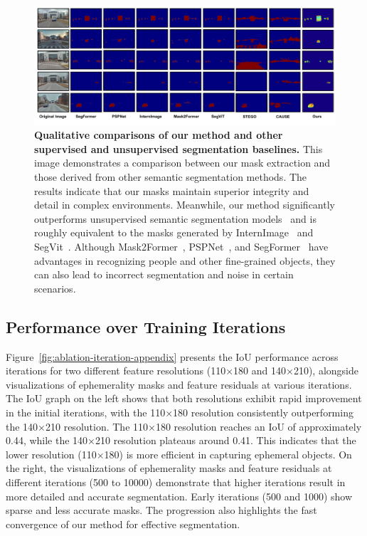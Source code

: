 \label{subsec:vis-compareison-appendix}
\begin{figure}[ht]
\begin{center}
\centerline{\includegraphics[width=\columnwidth]{figs_compressed/seg-compare_compressed.pdf}}
\caption{\textbf{Qualitative comparisons of our method and other supervised and unsupervised segmentation baselines.} This image demonstrates a comparison between our mask extraction and those derived from other semantic segmentation methods. The results indicate that our masks maintain superior integrity and detail in complex environments. Meanwhile, our method significantly outperforms unsupervised semantic segmentation models~\cite{hamilton2022unsupervised,kim2023causal} and is roughly equivalent to the masks generated by InternImage~\cite{wang2023internimage} and SegVit~\cite{zhang2022segvit}. Although Mask2Former~\cite{cheng2022masked}, PSPNet~\cite{zhao2017pspnet}, and SegFormer~\cite{xie2021segformer} have advantages in recognizing people and other fine-grained objects, they can also lead to incorrect segmentation and noise in certain scenarios. }
\label{fig:comparison-seg-appendix}
\end{center}
\vspace{-10mm}
\end{figure}

\clearpage

\subsection{Performance over Training Iterations }

Figure~\ref{fig:ablation-iteration-appendix} presents the IoU performance across iterations for two different feature resolutions (110×180 and 140×210), alongside visualizations of ephemerality masks and feature residuals at various iterations. The IoU graph on the left shows that both resolutions exhibit rapid improvement in the initial iterations, with the 110×180 resolution consistently outperforming the 140×210 resolution. The 110×180 resolution reaches an IoU of approximately 0.44, while the 140×210 resolution plateaus around 0.41. This indicates that the lower resolution (110×180) is more efficient in capturing ephemeral objects. On the right, the visualizations of ephemerality masks and feature residuals at different iterations (500 to 10000) demonstrate that higher iterations result in more detailed and accurate segmentation. Early iterations (500 and 1000) show sparse and less accurate masks. The progression also highlights the fast convergence of our method for effective segmentation.

